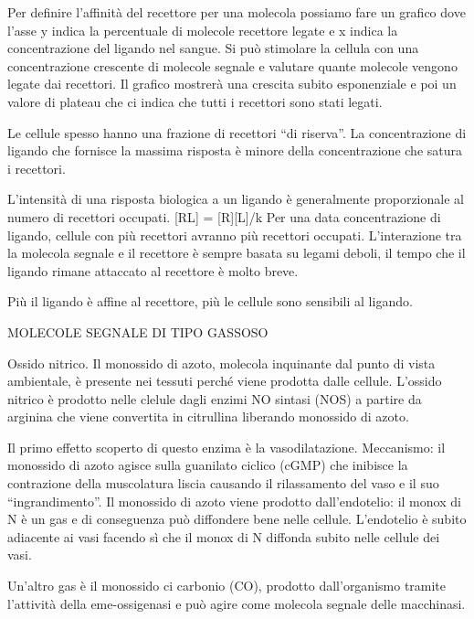 \documentclass[]{article}
\begin{document}
Per definire l'affinità del recettore per una molecola possiamo fare un
grafico dove l'asse y indica la percentuale di molecole recettore legate
e x indica la concentrazione del ligando nel sangue. Si può stimolare la
cellula con una concentrazione crescente di molecole segnale e valutare
quante molecole vengono legate dai recettori. Il grafico mostrerà una
crescita subito esponenziale e poi un valore di plateau che ci indica
che tutti i recettori sono stati legati.

Le cellule spesso hanno una frazione di recettori ``di riserva''. La
concentrazione di ligando che fornisce la massima risposta è minore
della concentrazione che satura i recettori.

L'intensità di una risposta biologica a un ligando è generalmente
proporzionale al numero di recettori occupati. {[}RL{]} =
{[}R{]}{[}L{]}/k Per una data concentrazione di ligando, cellule con più
recettori avranno più recettori occupati. L'interazione tra la molecola
segnale e il recettore è sempre basata su legami deboli, il tempo che il
ligando rimane attaccato al recettore è molto breve.

Più il ligando è affine al recettore, più le cellule sono sensibili al
ligando.

MOLECOLE SEGNALE DI TIPO GASSOSO

Ossido nitrico. Il monossido di azoto, molecola inquinante dal punto di
vista ambientale, è presente nei tessuti perché viene prodotta dalle
cellule. L'ossido nitrico è prodotto nelle clelule dagli enzimi NO
sintasi (NOS) a partire da arginina che viene convertita in citrullina
liberando monossido di azoto.

Il primo effetto scoperto di questo enzima è la vasodilatazione.
Meccanismo: il monossido di azoto agisce sulla guanilato ciclico (cGMP)
che inibisce la contrazione della muscolatura liscia causando il
rilassamento del vaso e il suo ``ingrandimento''. Il monossido di azoto
viene prodotto dall'endotelio: il monox di N è un gas e di conseguenza
può diffondere bene nelle cellule. L'endotelio è subito adiacente ai
vasi facendo sì che il monox di N diffonda subito nelle cellule dei
vasi.

Un'altro gas è il monossido ci carbonio (CO), prodotto dall'organismo
tramite l'attività della eme-ossigenasi e può agire come molecola
segnale delle macchinasi.
\end{document}
